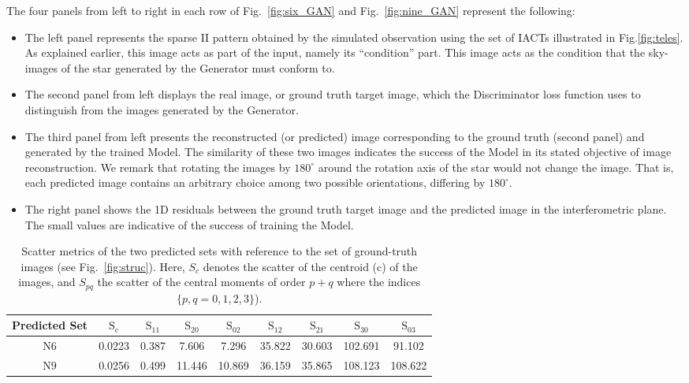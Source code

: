 The four panels from left to right in each row of Fig.~\ref{fig:six_GAN} and Fig.~\ref{fig:nine_GAN} represent the following:
\begin{itemize}
\item{The left panel represents the sparse II pattern obtained by the simulated observation using the set of IACTs illustrated in Fig.\ref{fig:teles}. As explained earlier, this image acts as part of the input, namely its ``condition'' part. This image acts as the condition that the sky-images of the star generated by the Generator must conform to.}
 
\item{The second panel from left displays the real image, or ground truth target image, which the Discriminator loss function uses to distinguish from the images generated by the Generator.}

\item{The third panel from left presents the reconstructed (or predicted) image corresponding to the ground truth (second panel) and generated by the trained Model. The similarity of these two images indicates the success of the Model in its stated objective of image reconstruction. We remark that rotating the images by $180^\circ$ around the rotation axis of the star would not change the image.  That is, each predicted image contains an arbitrary choice among two possible orientations, differing by $180^\circ$.}

\item{The right panel shows the 1D residuals between the ground truth target image and the predicted image in the interferometric plane. The small values are indicative of the success of training the Model.}
\end{itemize}

\begin{table}
	\centering
	\caption{Scatter metrics of the two predicted sets with reference to the set of ground-truth images (see Fig.~\ref{fig:struc}). Here, $S_c$ denotes the scatter of the centroid ($\mathrm{c}$) of the images, and $S_{pq}$ the scatter of the central moments of order $p+q$ where the indices $\{p,q = 0,1,2,3\}$).}
	\label{tab:mom}
	\begin{tabular}{ccccccccc}
		\toprule
		Predicted Set & $\mathrm{S}_\mathrm{c}$ & $\mathrm{S}_{11}$ & $\mathrm{S}_{20}$ & $\mathrm{S}_{02}$ & $\mathrm{S}_{12}$ & $\mathrm{S}_{21} $ & $\mathrm{S}_{30}$ & $\mathrm{S}_{03}$ \\
		\midrule
		$\mathrm{N6}$ & 0.0223 & 0.387 & 7.606 & 7.296 & 35.822 & 30.603 & 102.691 & 91.102 \\
		$\mathrm{N9}$ & 0.0256 & 0.499 & 11.446 & 10.869 & 36.159 & 35.865 & 108.123 & 108.622 \\
		\bottomrule
	\end{tabular}
\end{table}


